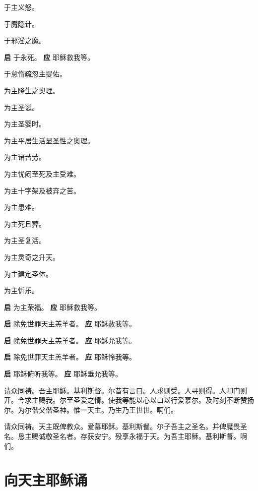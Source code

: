\documentclass[UTF8,17pt]{ctexart}
\begin{document}
 于主义怒。

 于魔隐计。

 于邪淫之魔。

\textbf{启} \quad 于永死。 \hfill  \textbf{应} \quad  耶稣救我等。 

 于怠惰疏忽主提佑。 

 为主降生之奥理。

 为主圣诞。

 为主圣婴时。 

 为主平居生活显圣性之奥理。

 为主诸苦劳。

 为主忧闷至死及主受难。 

 为主十字架及被弃之苦。

 为主患难。

 为主死且葬。

 为主圣复活。

 为主灵奇之升天。

 为主建定圣体。

 为主忻乐。

\textbf{启} \quad 为主荣福。 \hfill  \textbf{应} \quad  耶稣救我等。 \phantom{c}

\textbf{启} \quad 除免世罪天主羔羊者。 \hfill  \textbf{应} \quad 耶稣赦我等。\phantom{c}

\textbf{启} \quad 除免世罪天主羔羊者。 \hfill  \textbf{应} \quad 耶稣允我等。\phantom{c}

\textbf{启} \quad 除免世罪天主羔羊者。 \hfill  \textbf{应} \quad 耶稣怜我等。\phantom{c}

\textbf{启} \quad 耶稣俯听我等。 \hfill  \textbf{应} \quad  耶稣垂允我等。

请众同祷。吾主耶稣。基利斯督。尔昔有言曰。人求则受。人寻则得。人叩门则开。今求主赐我。尔至圣爱之情。使我等能以心以口以行爱慕尔。及时刻不断赞扬尔。为尔偕父偕圣神。惟一天主。乃生乃王世世。啊们。

请众同祷。天主既俾教众。爱慕耶稣。基利斯餐。尔子吾主之圣名。并俾魔畏圣名。恳主赐诚敬圣名者。存获安宁。殁享永福于天。为吾主耶稣。基利斯督。啊们。

\section{向天主耶稣诵}
\end{document}

